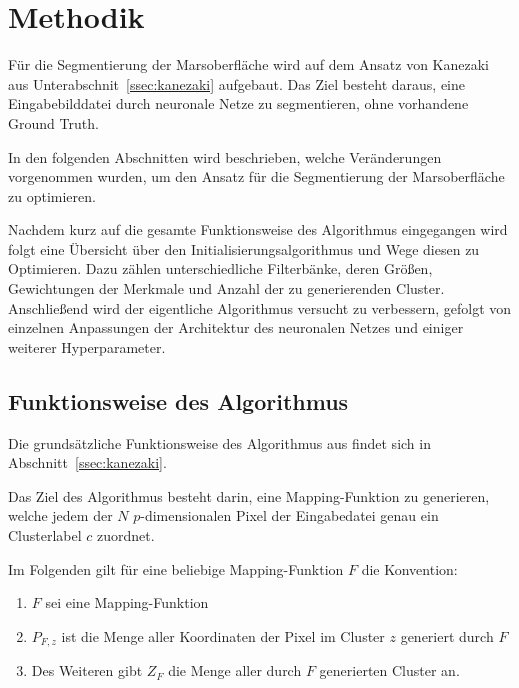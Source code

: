 \chapter{Methodik}
\label{chap:methodik}

Für die Segmentierung der Marsoberfläche wird auf dem Ansatz von Kanezaki \etal \cite{kanezaki_18} aus Unterabschnit~\ref{ssec:kanezaki} aufgebaut. Das Ziel besteht daraus, eine Eingabebilddatei durch neuronale Netze zu segmentieren, ohne vorhandene Ground Truth.

In den folgenden Abschnitten wird beschrieben, welche Veränderungen vorgenommen wurden, um den Ansatz für die Segmentierung der Marsoberfläche zu optimieren.

Nachdem kurz auf die gesamte Funktionsweise des Algorithmus eingegangen wird folgt eine Übersicht über den Initialisierungsalgorithmus und Wege diesen zu Optimieren. Dazu zählen \bspw unterschiedliche Filterbänke, deren Größen, Gewichtungen der Merkmale und Anzahl der zu generierenden Cluster. Anschließend wird der eigentliche Algorithmus versucht zu verbessern, gefolgt von einzelnen Anpassungen der Architektur des neuronalen Netzes und einiger weiterer Hyperparameter.

\section{Funktionsweise des Algorithmus}
\label{sec:howitworks}

Die grundsätzliche Funktionsweise des Algorithmus aus \cite{kanezaki_18} findet sich in Abschnitt~\ref{ssec:kanezaki}. 

Das Ziel des Algorithmus besteht darin, eine Mapping-Funktion zu generieren, welche jedem der $N$ $p$-dimensionalen Pixel der Eingabedatei genau ein Clusterlabel $c$ zuordnet.

Im Folgenden gilt für eine beliebige Mapping-Funktion $F$ die Konvention:

\begin{enumerate}
	\item $F$ sei eine Mapping-Funktion
	\item $P_{F,z}$ ist die Menge aller Koordinaten der Pixel im Cluster $z$ generiert durch $F$
	\item Des Weiteren gibt $Z_F$ die Menge aller durch $F$ generierten Cluster an.
\end{enumerate}

